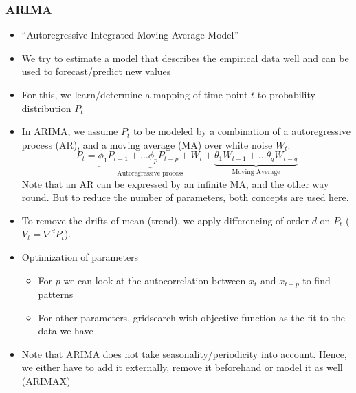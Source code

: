 \subsubsection{ARIMA}
\begin{itemize}
	\item ``Autoregressive Integrated Moving Average Model''
	\item We try to estimate a model that describes the empirical data well and can be used to forecast/predict new values
	\item For this, we learn/determine a mapping of time point $t$ to probability distribution $P_t$
	\item In ARIMA, we assume $P_t$ to be modeled by a combination of a autoregressive process (AR), and a moving average (MA) over white noise $W_t$:
	$$P_t = \underbrace{\phi_1 P_{t-1} + ... \phi_p P_{t-p} + W_t}_{\text{Autoregressive process}} + \underbrace{\theta_1 W_{t-1} + ... \theta_q W_{t-q}}_{\text{Moving Average}}$$
	Note that an AR can be expressed by an infinite MA, and the other way round. But to reduce the number of parameters, both concepts are used here.
	\item To remove the drifts of mean (trend), we apply differencing of order $d$ on $P_t$ ($V_t = \nabla^d P_t$). 
	\item Optimization of parameters
	\begin{itemize}
		\item For $p$ we can look at the autocorrelation between $x_t$ and $x_{t-p}$ to find patterns
		\item For other parameters, gridsearch with objective function as the fit to the data we have
	\end{itemize}
	\item Note that ARIMA does not take seasonality/periodicity into account. Hence, we either have to add it externally, remove it beforehand or model it as well (ARIMAX)
\end{itemize}
